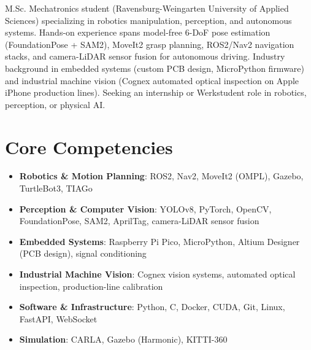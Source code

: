 \documentclass[11pt,a4paper,sans]{moderncv}
\begin{document}
\makecvtitle


\vspace{6pt}
\small{M.Sc. Mechatronics student (Ravensburg-Weingarten University of Applied Sciences) specializing in robotics manipulation, perception, and autonomous systems. Hands-on experience spans model-free 6-DoF pose estimation (FoundationPose + SAM2), MoveIt2 grasp planning, ROS2/Nav2 navigation stacks, and camera-LiDAR sensor fusion for autonomous driving. Industry background in embedded systems (custom PCB design, MicroPython firmware) and industrial machine vision (Cognex automated optical inspection on Apple iPhone production lines). Seeking an internship or Werkstudent role in robotics, perception, or physical AI.}


\section{Core Competencies}
\vspace{1pt}
\begin{itemize}

\item \textbf{Robotics \& Motion Planning}: ROS2, Nav2, MoveIt2 (OMPL), Gazebo, TurtleBot3, TIAGo

\item \textbf{Perception \& Computer Vision}: YOLOv8, PyTorch, OpenCV, FoundationPose, SAM2, AprilTag, camera-LiDAR sensor fusion

\item \textbf{Embedded Systems}: Raspberry Pi Pico, MicroPython, Altium Designer (PCB design), signal conditioning

\item \textbf{Industrial Machine Vision}: Cognex vision systems, automated optical inspection, production-line calibration

\item \textbf{Software \& Infrastructure}: Python, C, Docker, CUDA, Git, Linux, FastAPI, WebSocket

\item \textbf{Simulation}: CARLA, Gazebo (Harmonic), KITTI-360

\end{itemize}
\end{document}
